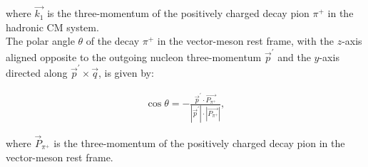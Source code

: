 \documentclass[12pt]{article}
\newcommand{\0}{{\mskip 2.5mu} 0 {\mskip 2.5mu}}
\begin{document}
where $\vec{k_1}$ is the three-momentum of the positively charged decay pion $\pi^+$ in the hadronic CM system.\\
The polar angle  $\theta$ of the decay $\pi^+$ in the vector-meson rest frame, with the $z$-axis aligned opposite to the outgoing nucleon three-momentum $\vec{p}^\prime$ and the $y$-axis directed along $\vec{p}^\prime \times \vec{q}$, is given by:

\begin{eqnarray}
\cos \theta  = -\frac{ \vec{p}^\prime \cdot \vec{P_{\pi^+}}}{| \vec{p}^\prime| \cdot |\vec{P_{\pi^+}}|},
\label{theta-def}
\end{eqnarray}

where $\vec{P}_{\pi^+}$ is the three-momentum of the
positively charged decay pion in the vector-meson rest frame.
 
\end{document}
